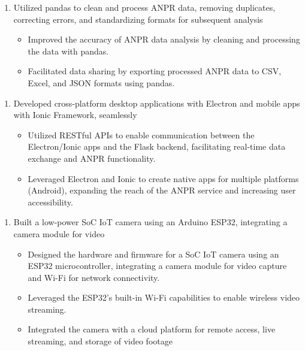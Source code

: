 \documentclass{article}
\begin{document}
\begin{enumerate}
    \item[] Utilized pandas to clean and process ANPR data,  removing duplicates, correcting errors, and standardizing formats for subsequent analysis
   \begin{itemize}
    \item Improved the accuracy of ANPR data analysis by  cleaning and processing the data with pandas. 
    \item Facilitated data sharing  by exporting processed ANPR data to CSV, Excel, and JSON formats using pandas.
   \end{itemize}
\end{enumerate}


\begin{enumerate}
    \item[]  Developed cross-platform desktop applications with Electron and mobile apps with Ionic Framework, seamlessly
   \begin{itemize}
    \item Utilized RESTful APIs to enable communication between the Electron/Ionic apps and the Flask backend, facilitating real-time data exchange and ANPR functionality.
    \item Leveraged Electron and Ionic to create native apps for multiple platforms (Android), expanding the reach of the ANPR service and increasing user accessibility.
   \end{itemize}
\end{enumerate}


\begin{enumerate}
    \item[] Built a low-power SoC IoT camera using an Arduino ESP32, integrating a camera module for video
   \begin{itemize}
    \item Designed the hardware and firmware for a SoC IoT camera using an ESP32 microcontroller, integrating a camera module for video capture and Wi-Fi for network connectivity.
    \item Leveraged the ESP32's built-in Wi-Fi capabilities to enable wireless video streaming. 
    \item Integrated the camera with a cloud platform for remote access, live streaming, and storage of video footage
   \end{itemize}
\end{enumerate}
\end{document}
